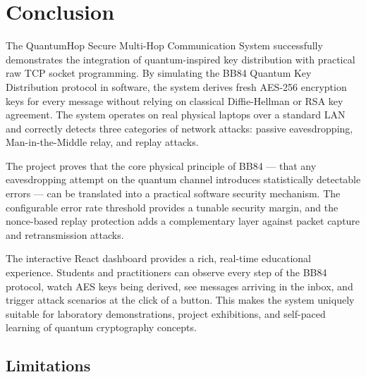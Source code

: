 \chapter{Conclusion}

The QuantumHop Secure Multi-Hop Communication System successfully demonstrates the integration of quantum-inspired key distribution with practical raw TCP socket programming. By simulating the BB84 Quantum Key Distribution protocol in software, the system derives fresh AES-256 encryption keys for every message without relying on classical Diffie-Hellman or RSA key agreement. The system operates on real physical laptops over a standard LAN and correctly detects three categories of network attacks: passive eavesdropping, Man-in-the-Middle relay, and replay attacks.

The project proves that the core physical principle of BB84 --- that any eavesdropping attempt on the quantum channel introduces statistically detectable errors --- can be translated into a practical software security mechanism. The configurable error rate threshold provides a tunable security margin, and the nonce-based replay protection adds a complementary layer against packet capture and retransmission attacks.

The interactive React dashboard provides a rich, real-time educational experience. Students and practitioners can observe every step of the BB84 protocol, watch AES keys being derived, see messages arriving in the inbox, and trigger attack scenarios at the click of a button. This makes the system uniquely suitable for laboratory demonstrations, project exhibitions, and self-paced learning of quantum cryptography concepts.

\section{Limitations}


